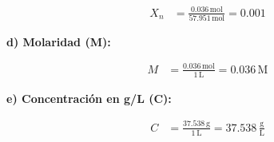 \documentclass{article}
\begin{document}
\begin{align*}
    X_n &= \frac{0.036 \, \text{mol}}{57.951 \, \text{mol}} = 0.001
\end{align*}

\textbf{d) Molaridad (M):}

\begin{align*}
    M &= \frac{0.036 \, \text{mol}}{1 \, \text{L}} = 0.036 \, \text{M}
\end{align*}

\textbf{e) Concentración en g/L (C):}

\begin{align*}
    C &= \frac{37.538 \, \text{g}}{1 \, \text{L}} = 37.538 \, \frac{\text{g}}{\text{L}}
\end{align*}

\end{document}
